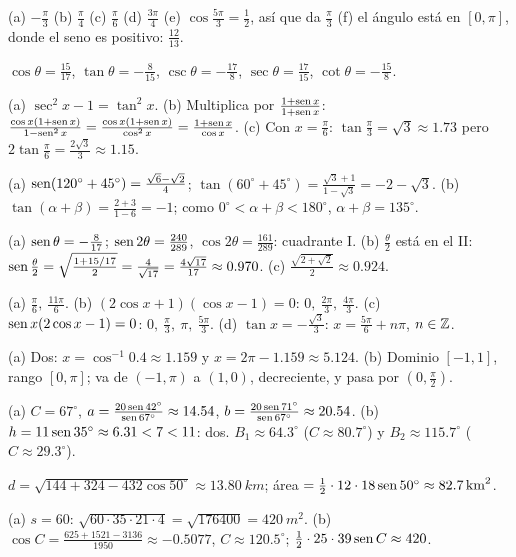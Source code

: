 \documentclass[11pt,a4paper]{article}
\begin{document}
\respuestas
\begin{respuestascortas}
\begin{soluciones}
\item (a) $-\tfrac{\pi}{3}$ (b) $\tfrac{\pi}{4}$ (c) $\tfrac{\pi}{6}$ (d) $\tfrac{3\pi}{4}$ (e) $\cos\tfrac{5\pi}{3}=\tfrac12$, así que da
  $\tfrac{\pi}{3}$ (f) el ángulo está en $[0,\pi]$, donde el seno es positivo: $\tfrac{12}{13}$.
\item $\cos\theta=\tfrac{15}{17}$, $\tan\theta=-\tfrac{8}{15}$, $\csc\theta=-\tfrac{17}{8}$, $\sec\theta=\tfrac{17}{15}$, $\cot\theta=-\tfrac{15}{8}$.
\item (a) $\sec^2x-1=\tan^2x$. (b) Multiplica por $\tfrac{1+\operatorname{sen} x}{1+\operatorname{sen} x}$: $\tfrac{\cos x(1+\operatorname{sen} x)}{1-\operatorname{sen}^2x}=\tfrac{\cos x(1+\operatorname{sen} x)}{\cos^2x}=\tfrac{1+\operatorname{sen} x}{\cos x}$.
  (c) Con $x=\tfrac{\pi}{6}$: $\tan\tfrac{\pi}{3}=\sqrt3\approx1.73$ pero $2\tan\tfrac{\pi}{6}=\tfrac{2\sqrt3}{3}\approx1.15$.
\item (a) $\operatorname{sen}(120^\circ+45^\circ)=\tfrac{\sqrt6-\sqrt2}{4}$; $\tan(60^\circ+45^\circ)=\tfrac{\sqrt3+1}{1-\sqrt3}=-2-\sqrt3$.
  (b) $\tan(\alpha+\beta)=\tfrac{2+3}{1-6}=-1$; como $0^\circ<\alpha+\beta<180^\circ$, $\alpha+\beta=135^\circ$.
\item (a) $\operatorname{sen}\theta=-\tfrac{8}{17}$; $\operatorname{sen}2\theta=\tfrac{240}{289}$, $\cos2\theta=\tfrac{161}{289}$: cuadrante I.
  (b) $\tfrac{\theta}{2}$ está en el II: $\operatorname{sen}\tfrac{\theta}{2}=\sqrt{\tfrac{1+15/17}{2}}=\tfrac{4}{\sqrt{17}}=\tfrac{4\sqrt{17}}{17}\approx0.970$.
  (c) $\tfrac{\sqrt{2+\sqrt2}}{2}\approx0.924$.
\item (a) $\tfrac{\pi}{6},\ \tfrac{11\pi}{6}$. (b) $(2\cos x+1)(\cos x-1)=0$: $0,\ \tfrac{2\pi}{3},\ \tfrac{4\pi}{3}$.
  (c) $\operatorname{sen} x(2\cos x-1)=0$: $0,\ \tfrac{\pi}{3},\ \pi,\ \tfrac{5\pi}{3}$. (d) $\tan x=-\tfrac{\sqrt3}{3}$: $x=\tfrac{5\pi}{6}+n\pi$, $n\in\mathbb{Z}$.
\item (a) Dos: $x=\cos^{-1}0.4\approx1.159$ y $x=2\pi-1.159\approx5.124$. (b) Dominio $[-1,1]$, rango $[0,\pi]$;
  va de $(-1,\pi)$ a $(1,0)$, decreciente, y pasa por $\left(0,\tfrac{\pi}{2}\right)$.
\item (a) $C=67^\circ$, $a=\tfrac{20\operatorname{sen}42^\circ}{\operatorname{sen}67^\circ}\approx14.54$, $b=\tfrac{20\operatorname{sen}71^\circ}{\operatorname{sen}67^\circ}\approx20.54$.
  (b) $h=11\operatorname{sen}35^\circ\approx6.31<7<11$: dos. $B_1\approx64.3^\circ$ ($C\approx80.7^\circ$) y $B_2\approx115.7^\circ$ ($C\approx29.3^\circ$).
\item $d=\sqrt{144+324-432\cos50^\circ}\approx\SI{13.80}{km}$; área $=\tfrac12\cdot12\cdot18\operatorname{sen}50^\circ\approx\SI{82.7}{km^2}$.
\item (a) $s=60$: $\sqrt{60\cdot35\cdot21\cdot4}=\sqrt{176400}=\SI{420}{m^2}$. (b) $\cos C=\tfrac{625+1521-3136}{1950}\approx-0.5077$,
  $C\approx120.5^\circ$; $\tfrac12\cdot25\cdot39\operatorname{sen} C\approx420$.
\end{soluciones}
\end{respuestascortas}
\end{document}
